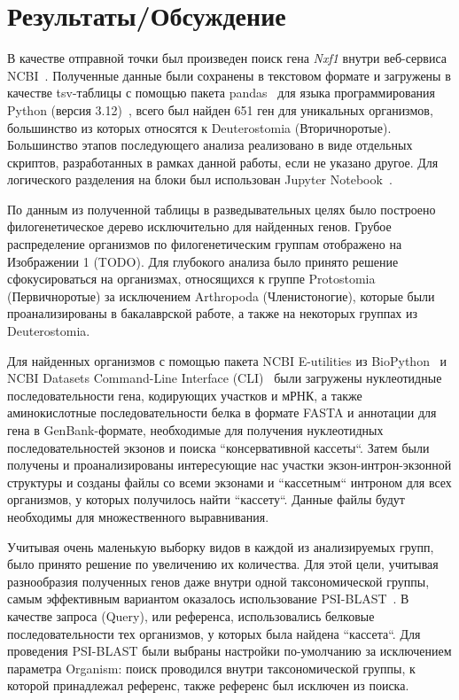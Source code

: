 \newpage
\section{Результаты/Обсуждение}

В качестве отправной точки был произведен поиск гена \textit{Nxf1} внутри веб-сервиса NCBI~\cite{ncbi_general}.
Полученные данные были сохранены в текстовом формате и загружены в качестве tsv-таблицы с помощью пакета pandas~\cite{pandas} для языка программирования Python (версия 3.12)~\cite{python_3_12}, всего был найден 651 ген для уникальных организмов, большинство из которых относятся к Deuterostomia (Вторичноротые).
Большинство этапов последующего анализа реализовано в виде отдельных скриптов, разработанных в рамках данной работы, если не указано другое.
Для логического разделения на блоки был использован Jupyter Notebook~\cite{jupyter_notebook}.

По данным из полученной таблицы в разведывательных целях было построено филогенетическое дерево исключительно для найденных генов.
Грубое распределение организмов по филогенетическим группам отображено на Изображении 1 (TODO).
Для глубокого анализа было принято решение сфокусироваться на организмах, относящихся к группе Protostomia (Первичноротые) за исключением Arthropoda (Членистоногие), которые были проанализированы в бакалаврской работе, а также на некоторых группах из Deuterostomia.

Для найденных организмов с помощью пакета NCBI E-utilities из BioPython~\cite{biopython} и NCBI Datasets Command-Line Interface (CLI)~\cite{datasets} были загружены нуклеотидные последовательности гена, кодирующих участков и мРНК, а также аминокислотные последовательности белка в формате FASTA и аннотации для гена в GenBank-формате, необходимые для получения нуклеотидных последовательностей экзонов и поиска ``консервативной кассеты``.
Затем были получены и проанализированы интересующие нас участки экзон-интрон-экзонной структуры и созданы файлы со всеми экзонами и ``кассетным`` интроном для всех организмов, у которых получилось найти ``кассету``.
Данные файлы будут необходимы для множественного выравнивания.

Учитывая очень маленькую выборку видов в каждой из анализируемых групп, было принято решение по увеличению их количества.
Для этой цели, учитывая разнообразия полученных генов даже внутри одной таксономической группы, самым эффективным вариантом оказалось использование PSI-BLAST~\cite{psi_blast}.
В качестве запроса (Query), или референса, использовались белковые последовательности тех организмов, у которых была найдена ``кассета``.
Для проведения PSI-BLAST были выбраны настройки по-умолчанию за исключением параметра Organism: поиск проводился внутри таксономической группы, к которой принадлежал референс, также референс был исключен из поиска.


